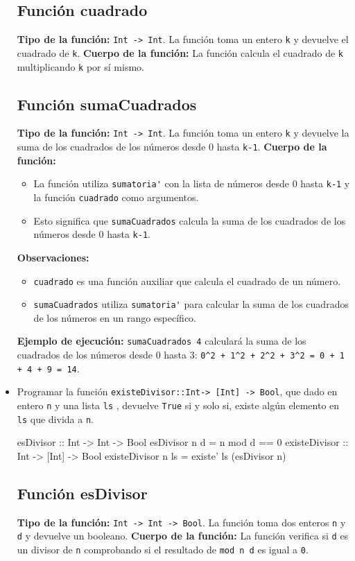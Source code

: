 \documentclass{article}
\begin{document}
\begin{itemize}
\subsection*{Función cuadrado}
\textbf{Tipo de la función:} \verb|Int -> Int|. La función toma un entero \verb|k| y devuelve el cuadrado de \verb|k|.
\textbf{Cuerpo de la función:} La función calcula el cuadrado de \verb|k| multiplicando \verb|k| por sí mismo.
\subsection*{Función sumaCuadrados}
\textbf{Tipo de la función:} \verb|Int -> Int|. La función toma un entero \verb|k| y devuelve la suma de los cuadrados de los números desde 0 hasta \verb|k-1|.
\newline \textbf{Cuerpo de la función:}
\begin{itemize}
\item La función utiliza \verb|sumatoria'| con la lista de números desde 0 hasta \verb|k-1| y la función \verb|cuadrado| como argumentos.
\item Esto significa que \verb|sumaCuadrados| calcula la suma de los cuadrados de los números desde 0 hasta \verb|k-1|.
\end{itemize}
\textbf{Observaciones:}
\begin{itemize}
\item \verb|cuadrado| es una función auxiliar que calcula el cuadrado de un número.
\item \verb|sumaCuadrados| utiliza \verb|sumatoria'| para calcular la suma de los cuadrados de los números en un rango específico.
\end{itemize}
\textbf{Ejemplo de ejecución:} \verb|sumaCuadrados 4| calculará la suma de los cuadrados de los números desde 0 hasta 3: \verb|0^2 + 1^2 + 2^2 + 3^2 = 0 + 1 + 4 + 9 = 14|.

    \item 
Programar la función \verb|existeDivisor::Int-> [Int] -> Bool|, que dado en entero \verb|n| y una lista \verb|ls| , devuelve \verb|True| si y solo si, existe algún elemento en \verb|ls| que divida a \verb|n|.
\begin{haskell}
esDivisor :: Int -> Int -> Bool
esDivisor n d = n mod d == 0
existeDivisor :: Int -> [Int] -> Bool
existeDivisor n ls = existe' ls (esDivisor n)
\end{haskell}
\subsection*{Función esDivisor}
\textbf{Tipo de la función:} \verb|Int -> Int -> Bool|. La función toma dos enteros \verb|n| y \verb|d| y devuelve un booleano.
\textbf{Cuerpo de la función:} La función verifica si \verb|d| es un divisor de \verb|n| comprobando si el resultado de \verb|mod n d| es igual a \verb|0|.

\end{itemize}
\end{document}
